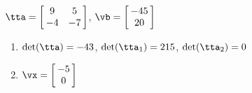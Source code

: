 {$\tta = \left[\hskip -3pt \begin{array}{cc} 9&5\\  -4&-7\end {array} \hskip -3pt
 \right] $,
 \quad
$\vb = \left[\hskip -3pt \begin{array}{c} -45\\  20\end {array} \hskip -3pt
 \right]$}
{\begin{enumerate}
\item	$\det(\tta) = -43$, $\det(\tta_1) = 215$, $\det(\tta_2) = 0$
\item $\vx = \left[\hskip -3pt \begin{array}{c} -5\\  0\end{array}\hskip -3pt \right]$
\end{enumerate}
}
